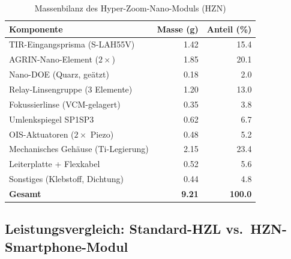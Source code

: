 ﻿\documentclass[12pt,a4paper]{article}
\theoremstyle{definition}
\begin{document}
	\begin{table}[H]
		\centering
		\caption{Massenbilanz des Hyper-Zoom-Nano-Moduls (HZN)}
		\label{tab:mass_budget}
		\begin{tabular}{lrr}
			\toprule
			\textbf{Komponente} & \textbf{Masse (g)} & \textbf{Anteil (\%)}\\
			\midrule
			\rowcolor{blue!8}
			TIR-Eingangsprisma (S-LAH55V)       & 1.42 & 15.4 \\
			AGRIN-Nano-Element ($2\times$)       & 1.85 & 20.1 \\
			\rowcolor{blue!8}
			Nano-DOE (Quarz, geätzt)             & 0.18 &  2.0 \\
			Relay-Linsengruppe (3 Elemente)      & 1.20 & 13.0 \\
			\rowcolor{blue!8}
			Fokussierlinse (VCM-gelagert)        & 0.35 &  3.8 \\
			Umlenkspiegel SP1\textendash SP3     & 0.62 &  6.7 \\
			\rowcolor{blue!8}
			OIS-Aktuatoren ($2\times$ Piezo)     & 0.48 &  5.2 \\
			Mechanisches Geh\"ause (Ti-Legierung)& 2.15 & 23.4 \\
			\rowcolor{blue!8}
			Leiterplatte + Flexkabel             & 0.52 &  5.6 \\
			Sonstiges (Klebstoff, Dichtung)      & 0.44 &  4.8 \\
			\midrule
			\textbf{Gesamt}                      & \textbf{9.21} & \textbf{100.0} \\
			\bottomrule
		\end{tabular}
	\end{table}

	\subsection{Leistungsvergleich: Standard-HZL vs.\ HZN-Smartphone-Modul}
\end{document}
